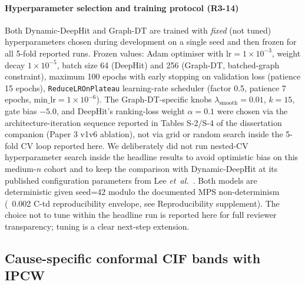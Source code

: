 \documentclass[11pt]{article}
\begin{document}
\paragraph*{Hyperparameter selection and training protocol (R3-14)} Both Dynamic-DeepHit and Graph-DT are trained with \emph{fixed} (not tuned) hyperparameters chosen during development on a single seed and then frozen for all 5-fold reported runs. Frozen values: Adam optimiser with $\mathrm{lr}{=}1{\times}10^{-3}$, weight decay $1{\times}10^{-5}$, batch size 64 (DeepHit) and 256 (Graph-DT, batched-graph constraint), maximum 100 epochs with early stopping on validation loss (patience 15 epochs), \texttt{ReduceLROnPlateau} learning-rate scheduler (factor 0.5, patience 7 epochs, $\mathrm{min\_lr}{=}1{\times}10^{-6}$). The Graph-DT-specific knobs $\lambda_{\mathrm{smooth}}{=}0.01$, $k{=}15$, gate bias $-5.0$, and DeepHit's ranking-loss weight $\alpha{=}0.1$ were chosen via the architecture-iteration sequence reported in Tables S-2/S-4 of the dissertation companion (Paper 3 v1\textendash v6 ablation), not via grid or random search inside the 5-fold CV loop reported here. We deliberately did not run nested-CV hyperparameter search inside the headline results to avoid optimistic bias on this medium-$n$ cohort and to keep the comparison with Dynamic-DeepHit at its published configuration parameters from Lee \emph{et~al.}~\cite{lee2018deephit,lee2019}. Both models are deterministic given seed=42 modulo the documented MPS non-determinism (~0.002 C-td reproducibility envelope, see Reproducibility supplement). The choice not to tune within the headline run is reported here for full reviewer transparency; tuning is a clear next-step extension.

\subsection*{Cause-specific conformal CIF bands with IPCW}
\end{document}
